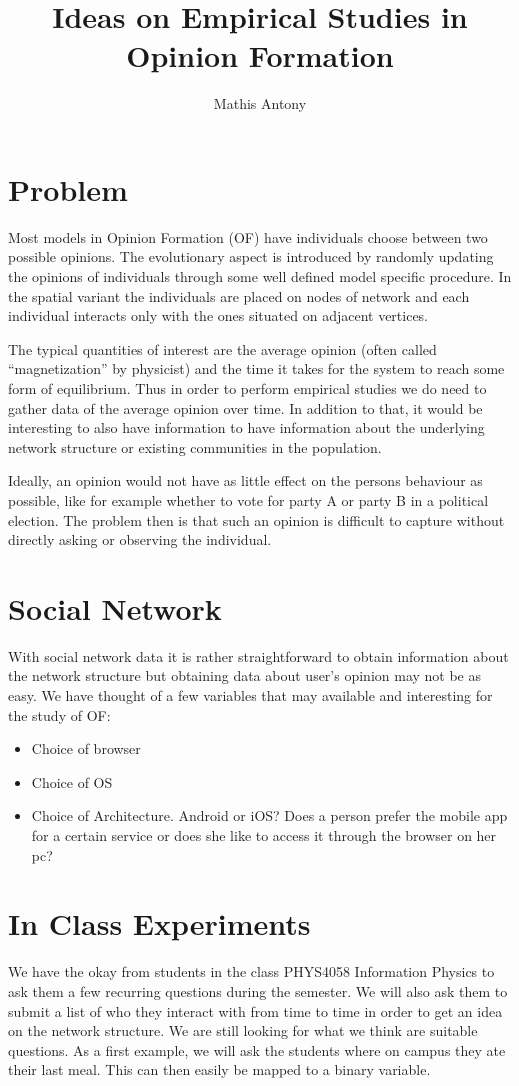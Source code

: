 \documentclass[a4paper]{scrartcl}
\begin{document}
\title{Ideas on Empirical Studies in Opinion Formation}
\author{Mathis Antony}
\maketitle
\tableofcontents
\section{Problem}
Most models in Opinion Formation (OF) have individuals choose between two possible opinions.
The evolutionary aspect is introduced by randomly updating the opinions of individuals through some well defined model specific procedure.
In the spatial variant the individuals are placed on nodes of network and each individual interacts only with the ones situated on adjacent vertices.

The typical quantities of interest are the average opinion (often called ``magnetization'' by physicist) and the time it takes for the system to reach some form of equilibrium.
Thus in order to perform empirical studies we do need to gather data of the average opinion over time.
In addition to that, it would be interesting to also have information to have information about the underlying network structure or existing communities in the population.

Ideally, an opinion would not have as little effect on the persons behaviour as possible, like for example whether to vote for party A or party B in a political election.
The problem then is that such an opinion is difficult to capture without directly asking or observing the individual.
%
\section{Social Network}
With social network data it is rather straightforward to obtain information about the network structure but obtaining data about user's opinion may not be as easy.
We have thought of a few variables that may available and interesting for the study of OF:
\begin{itemize}
\item Choice of browser
\item Choice of OS
\item Choice of Architecture. Android or iOS? Does a person prefer the mobile app for a certain service or does she like to access it through the browser on her pc?
\end{itemize}
\section{In Class Experiments}
We have the okay from students in the class PHYS4058 Information Physics to ask them a few recurring questions during the semester.
We will also ask them to submit a list of who they interact with from time to time in order to get an idea on the network structure.
We are still looking for what we think are suitable questions.
As a first example, we will ask the students where on campus they ate their last meal.
This can then easily be mapped to a binary variable.
\end{document}
